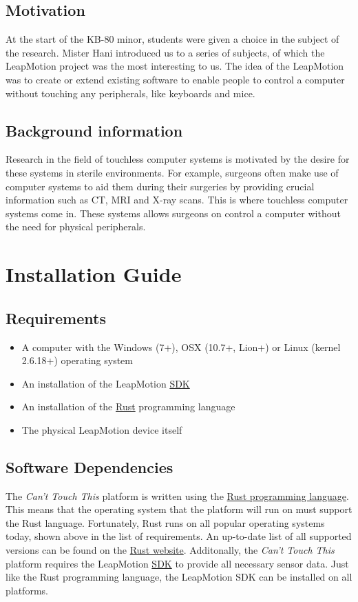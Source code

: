 \documentclass[a4paper]{article}
\providecommand{\tightlist}{%
\setlength{\itemsep}{0pt}\setlength{\parskip}{0pt}}
\begin{document}
  \subsection{Motivation}
  At the start of the KB-80 minor, students were given a choice in the subject
  of the research. Mister Hani introduced us to a series of subjects, of which
  the LeapMotion project was the most interesting to us. The idea of the
  LeapMotion was to create or extend existing software to enable people to
  control a computer without touching any peripherals, like keyboards and mice.

  \subsection{Background information}
  Research in the field of touchless computer systems is motivated by the desire
  for these systems in sterile environments. For example, surgeons often make
  use of computer systems to aid them during their surgeries by providing
  crucial information such as CT, MRI and X-ray scans. This is where touchless
  computer systems come in. These systems allows surgeons on control a computer
  without the need for physical peripherals.
  \clearpage

  \section{Installation Guide}
  \subsection{Requirements}
  \begin{itemize}
    \tightlist{}
    \item A computer with the Windows (7+), OSX (10.7+, Lion+) or
      Linux (kernel 2.6.18+) operating system
    \item An installation of the LeapMotion
      \href{https://developer.leapmotion.com/sdk/v2}{SDK}
    \item An installation of the
      \href{https://rustup.rs}{Rust} programming language
    \item The physical LeapMotion device itself
  \end{itemize}

  \subsection{Software Dependencies}
  The \textit{Can't Touch This} platform is written using the
  \href{https://rust-lang.org}{Rust programming language}. This means that the
  operating system that the platform will run on must support the Rust language.
  Fortunately, Rust runs on all popular operating systems today, shown above in
  the list of requirements. An up-to-date list of all supported versions can be
  found on the
  \href{https://forge.rust-lang.org/platform-support.html}{Rust website}.
  Additonally, the \textit{Can't Touch This} platform requires the LeapMotion
  \href{https://developer.leapmotion.com/sdk/v2}{SDK} to provide all necessary
  sensor data. Just like the Rust programming language, the LeapMotion SDK can
  be installed on all platforms.
\end{document}
